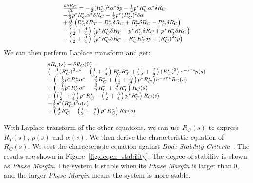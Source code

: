 \begin{equation}
\small
\begin{array}{l}
\frac{{d\delta {R_C}}}{{dt}} =  - \frac{1}{2}{(R_C^*)^2}{\alpha ^*}\delta p - \frac{1}{2}{p^*}R_C^*{\alpha ^*}\delta R_C \\
 - \frac{1}{2}{p^*}R_C^*{\alpha ^*}\delta {R_C} - \frac{1}{2}{p^*}{(R_C^*)^2}\delta \alpha \\
 + \frac{A}{2}\left( {R_C^*\delta {R_T} - R_C^*\delta {R_C} + R_T^*\delta {R_C} - R_C^*\delta R_C} \right)\\
 - \left( {\frac{1}{2} + \frac{A}{4}} \right)\left( {{p^*}R_C^*\delta {R_T} - {p^*}R_C^*\delta {R_C} + {p^*}R_T^*\delta {R_C}} \right)\\ 
 - \left( {\frac{1}{2} + \frac{A}{4}} \right)\left( {{p^*}R_C^*\delta R_C - R_C^*R_T^*\delta p + {{(R_C^*)}^2}\delta p} \right)
\end{array}
\end{equation}
We can then perform Laplace transform and get:
\begin{equation}
\small
\begin{array}{l}
s{R_C}(s) - \delta {R_C}(0) = \\
\left( { - \frac{1}{2}{{(R_C^*)}^2}{\alpha ^*} - \left( {\frac{1}{2} + \frac{A}{4}} \right)R_C^*R_T^* + \left( {\frac{1}{2} + \frac{A}{4}} \right){{(R_C^*)}^2}} \right){e^{ - s\tau *}}p(s)\\
 + \left( { - \frac{1}{2}{p^*}R_C^*{\alpha ^*} - \frac{A}{2}R_C^* + \left( {\frac{1}{2} + \frac{A}{4}} \right){p^*}R_C^*} \right){e^{ - s\tau *}}{R_C}(s)\\
 + \left( { - \frac{1}{2}{p^*}R_C^*{\alpha ^*} - \frac{A}{2}R_C^* + \frac{A}{2}R_T^* }\right){R_C}(s)\\
 + \left( { \left( {\frac{1}{2} + \frac{A}{4}} \right){p^*}R_C^* - \left( {\frac{1}{2} + \frac{A}{4}} \right){p^*}R_T^*} \right){R_C}(s)\\
 - \frac{1}{2}{p^*}{(R_C^*)^2}\alpha (s)\\
 + \left( {\frac{A}{2}R_C^* - \left( {\frac{1}{2} + \frac{A}{4}} \right){p^*}R_C^*} \right){R_T}(s)
\end{array}
\end{equation}

With Laplace transform of the other equations, we can use ${R_C}(s)$ to express
${R_T}(s)$, $p(s)$ and $\alpha (s)$.  We then derive the characteristic equation
of ${R_C}(s)$. We test the characteristic equation against {\em Bode Stability
Criteria}~\cite{controltheory}. The results are shown in
Figure~\ref{fig:dcqcn_stability}.  The degree of stability is shown as {\em
Phase Margin}. The system is stable when its {\em Phase Margin} is larger than
0, and the larger {\em Phase Margin} means the system is more stable.

